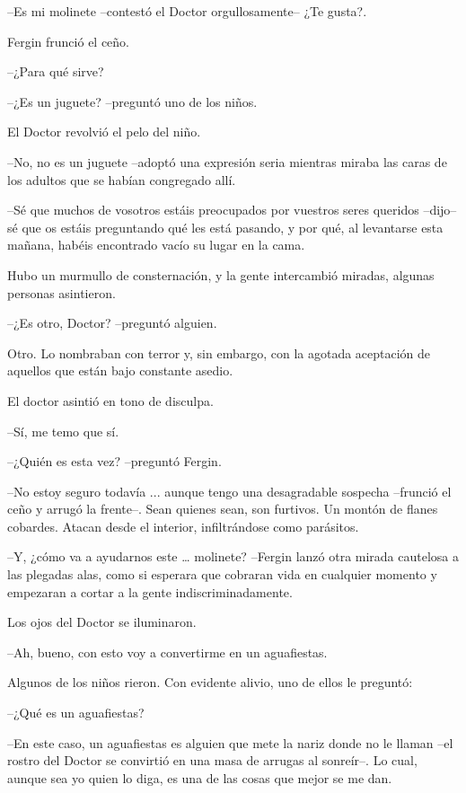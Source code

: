 --Es mi molinete --contestó el Doctor orgullosamente-- ¿Te gusta?.

Fergin frunció el ceño. 

--¿Para qué sirve?

--¿Es un juguete? --preguntó uno de los niños.

El Doctor revolvió el pelo del niño.

--No, no es un juguete --adoptó una expresión seria mientras miraba las caras de los adultos que se habían congregado allí.

--Sé que muchos de vosotros estáis preocupados por vuestros seres queridos --dijo-- sé que os estáis preguntando qué les está pasando, y por qué, al levantarse esta mañana, habéis encontrado vacío su lugar en la cama.

Hubo un murmullo de consternación, y la gente intercambió miradas, algunas personas asintieron.

--¿Es otro, Doctor? --preguntó alguien.

Otro. Lo nombraban con terror y, sin embargo, con la agotada aceptación de aquellos que están bajo constante asedio.

El doctor asintió en tono de disculpa. 

--Sí, me temo que sí.

--¿Quién es esta vez? --preguntó Fergin.

--No estoy seguro todavía ... aunque tengo una desagradable sospecha --frunció el ceño y arrugó la frente--. Sean quienes sean, son furtivos. Un montón de flanes cobardes. Atacan desde el interior, infiltrándose como parásitos.

--Y, ¿cómo va a ayudarnos este … molinete? --Fergin lanzó otra mirada cautelosa a las plegadas alas, como si esperara que cobraran vida en cualquier momento y empezaran a cortar a la gente indiscriminadamente.

Los ojos del Doctor se iluminaron. 

--Ah, bueno, con esto voy a convertirme en un aguafiestas.

Algunos de los niños rieron. Con evidente alivio, uno de ellos le preguntó: 

--¿Qué es un aguafiestas?

--En este caso, un aguafiestas es alguien que mete la nariz donde no le llaman --el rostro del Doctor se convirtió en una masa de arrugas al sonreír--. Lo cual, aunque sea yo quien lo diga, es una de las cosas que mejor se me dan.



